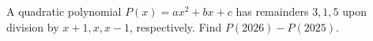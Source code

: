 A quadratic polynomial $P(x)=ax^2+bx+c$ has remainders $3,1,5$ upon division by $x+1,x,x-1$, respectively. Find $P(2026)-P(2025)$.
